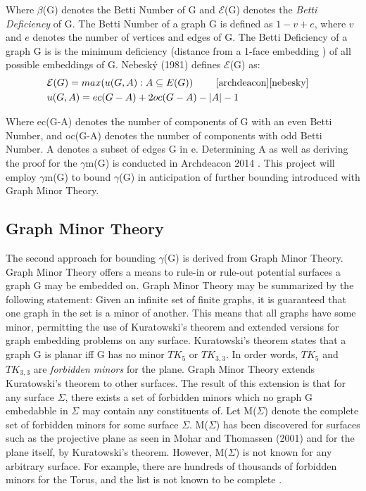 \documentclass[12pt,conference]{IEEEtran}
\begin{document}
Where $\beta$(G) denotes the Betti Number of G and $\mathcal{E}$(G) denotes the \textit{Betti Deficiency} of G. The Betti Number of a graph G is defined as $1 - v + e$, where $v$ and $e$ denotes the number of vertices and edges of G. The Betti Deficiency of a graph G is is the minimum deficiency (distance from a 1-face embedding \cite{archdeacon}) of all possible embeddings of G. Nebesk\'y (1981) defines $\mathcal{E}$(G) as:
\begin{align*}
&\ \mathcal{E}(G) =  max(u (G,A) : A \subseteq E(G)) \ \ \ \ \ \ \ \cite{archdeacon} \cite{nebesky}\\
&\ u(G,A) = ec(G-A) + 2oc(G-A) - |A| - 1 &\
\end{align*} 

Where ec(G-A) denotes the number of components of G with an even Betti Number, and oc(G-A) denotes the number of components with odd Betti Number. A denotes a subset of edges G in e. Determining A as well as deriving the proof for the $\gamma$m(G) is conducted in Archdeacon 2014 \cite{archdeacon}. This project will employ $\gamma$m(G) to bound $\gamma$(G) in anticipation of further bounding introduced with Graph Minor Theory.

\subsection{Graph Minor Theory}

The second approach for bounding $\gamma$(G) is derived from Graph Minor Theory. Graph Minor Theory offers a means to rule-in or rule-out potential surfaces a graph G may be embedded on. Graph Minor Theory may be summarized by the following statement: Given an infinite set of finite graphs, it is guaranteed that one graph in the set is a minor of another. This means that all graphs have some minor, permitting the use of Kuratowski's theorem and extended versions for graph embedding problems on any surface. Kuratowski's theorem states that a graph G is planar iff G has no minor $TK_{5}$ or $TK_{3,3}$. In order words, $TK_{5}$ and $TK_{3,3}$ are \textit{forbidden minors} for the plane. Graph Minor Theory extends Kuratowski's theorem to other surfaces. The result of this extension is that for any surface $\Sigma$, there exists a set of forbidden minors which no graph G embedabble in $\Sigma$ may contain any constituents of. Let M($\Sigma$) denote the complete set of forbidden minors for some surface $\Sigma$. M($\Sigma$) has been discovered for surfaces such as the projective plane as seen in Mohar and Thomassen (2001) \cite{mohar-thomassen} and for the plane itself, by Kuratowski's theorem. However, M($\Sigma$) is not known for any arbitrary surface. For example, there are hundreds of thousands of forbidden minors for the Torus, and the list is not known to be complete \cite{gagarin-myrvold}. 
\end{document}
